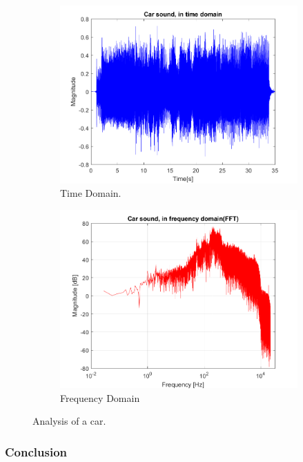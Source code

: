 \begin{figure}
	\begin{subfigure}[b]{.5\linewidth}
		\centering
		\includegraphics[width=\textwidth]{code/Car_figure1.png}
		\caption{Time Domain.}\label{fig:car_time}
	\end{subfigure}%
	\begin{subfigure}[b]{.5\linewidth}
		\centering
		\includegraphics[width=\textwidth]{code/Car_figure2.png}
		\caption{Frequency Domain}\label{fig:car_freq}
	\end{subfigure}%
	\caption{Analysis of a car.}
	\label{fig:car}
\end{figure}


\subsubsection{Conclusion}

